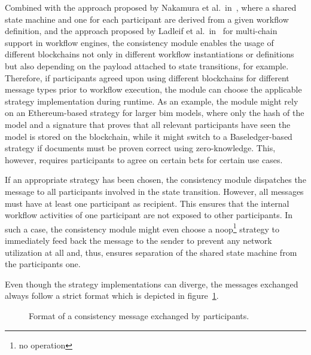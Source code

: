 Combined with the approach proposed by Nakamura et al.\ in~\cite{inter_organizational_bps_managed_by_blockchain}, where a shared state machine and one for each participant are derived from a given workflow definition, and the approach proposed by Ladleif et al.\ in~\cite{architecture_for_multi_chain_bp_ladleif} for multi-chain support in workflow engines, the consistency module enables the usage of different blockchains not only in different workflow instantiations or definitions but also depending on the payload attached to state transitions, for example. Therefore, if participants agreed upon using different blockchains for different message types prior to workflow execution, the module can choose the applicable strategy implementation during runtime. As an example, the module might rely on an Ethereum-based strategy for larger \gls{bim} models, where only the hash of the model and a signature that proves that all relevant participants have seen the model is stored on the blockchain, while it might switch to a Baseledger-based strategy if documents must be proven correct using zero-knowledge. This, however, requires participants to agree on certain \glspl{bct} for certain use cases.

If an appropriate strategy has been chosen, the consistency module dispatches the message to all participants involved in the state transition. However, all messages must have at least one participant as recipient. This ensures that the internal workflow activities of one participant are not exposed to other participants. In such a case, the consistency module might even choose a noop\footnote{no operation} strategy to immediately feed back the message to the sender to prevent any network utilization at all and, thus, ensures separation of the shared state machine from the participants one.

Even though the strategy implementations can diverge, the messages exchanged always follow a strict format which is depicted in figure~\ref{fig:ttsm:proposal:consistency_message_format}.

\begin{figure}[h]
    \caption{Format of a consistency message exchanged by participants.}
    \label{fig:ttsm:proposal:consistency_message_format}
\end{figure}

